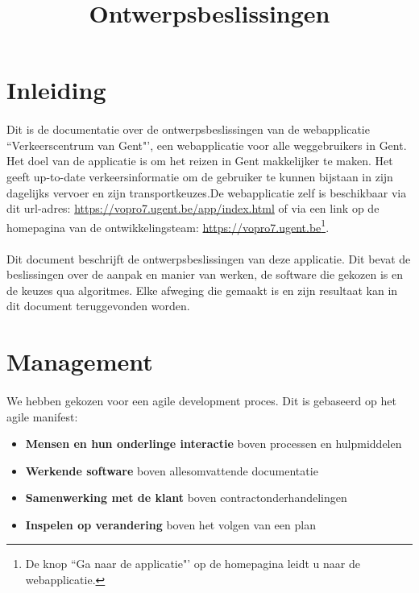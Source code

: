 \documentclass[11pt,twoside,a4paper]{article}
\title{Ontwerpsbeslissingen}
\begin{document}




	\tableofcontents
	
	\newpage
	
	\section{Inleiding}
	\paragraph{}Dit is de documentatie over de ontwerpsbeslissingen van de webapplicatie ``Verkeerscentrum van Gent"', een webapplicatie voor alle weggebruikers in Gent. Het doel van de applicatie is om het reizen in Gent makkelijker te maken.%
	Het geeft up-to-date verkeersinformatie om de gebruiker te kunnen bijstaan in zijn dagelijks vervoer en zijn transportkeuzes.De webapplicatie zelf is beschikbaar via dit url-adres: \url{https://vopro7.ugent.be/app/index.html} of via een link op de homepagina van de ontwikkelingsteam: \url{https://vopro7.ugent.be}\footnote{De knop ``Ga naar de applicatie"' op de homepagina leidt u naar de webapplicatie.}.
	\paragraph{}Dit document beschrijft de ontwerpsbeslissingen van deze applicatie. Dit bevat de beslissingen over de aanpak en manier van werken, de software die gekozen is en de keuzes qua algoritmes. Elke afweging die gemaakt is en zijn resultaat kan in dit document teruggevonden worden.
	
	\section{Management}
	
	\paragraph{} We hebben gekozen voor een agile development proces. Dit is gebaseerd op het agile manifest:
	
	\begin{itemize}
	\item \textbf{Mensen en hun onderlinge interactie} boven processen en hulpmiddelen
	\item \textbf{Werkende software} boven allesomvattende documentatie
	\item \textbf{Samenwerking met de klant} boven contractonderhandelingen
	\item \textbf{Inspelen op verandering} boven het volgen van een plan
	\end{itemize}
	
\end{document}
